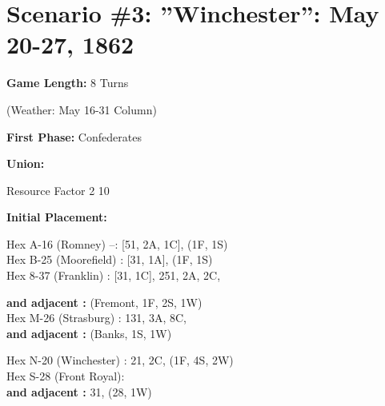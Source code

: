 \section{Scenario \#3: ''Winchester'': May 20-27, 1862
}


\begin{scenariodata}
\textbf{Game Length:} 8 Turns\\
\end{scenariodata}

\begin{scenariodata}
(Weather: May 16-31 Column)\\
\end{scenariodata}

\begin{scenariodata}
\textbf{First Phase:} Confederates\\
\end{scenariodata}

\begin{scenariodata}
\textbf{Union:}\\
\end{scenariodata}

\begin{scenariodata}
Resource Factor 2 10\\
\end{scenariodata}

\begin{scenariodata}
\textbf{Initial Placement:}\\
\end{scenariodata}

\begin{scenariodata}
Hex A-16 (Romney) --: [51, 2A, 1C], (1F, 1S)\\
Hex B-25 (Moorefield) : [31, 1A], (1F, 1S)\\
Hex 8-37 (Franklin) : [31, 1C], 251, 2A, 2C,\\
\end{scenariodata}

\begin{scenariodata}
\textbf{and adjacent :} (Fremont, 1F, 2S, 1W)\\
Hex M-26 (Strasburg) : 131, 3A, 8C,\\
\textbf{and adjacent :} (Banks, 1S, 1W)\\
\end{scenariodata}

\begin{scenariodata}
Hex N-20 (Winchester) : 21, 2C, (1F, 4S, 2W)\\
Hex S-28 (Front Royal):\\
\textbf{and adjacent :} 31, (28, 1W)\\
\end{scenariodata}

